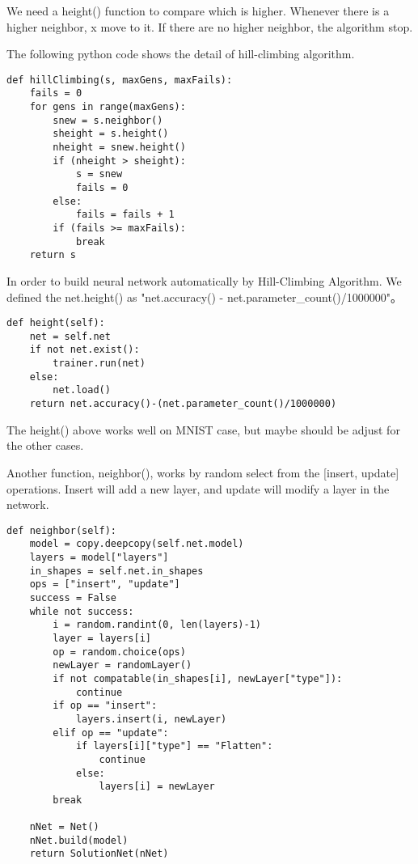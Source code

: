 \documentclass{article}
\begin{document}
We need a height() function to compare which is higher. Whenever there is a higher neighbor, x move to it. If there are no higher neighbor, the algorithm stop.

The following python code shows the detail of hill-climbing algorithm. 

\begin{minipage}{\linewidth}
\begin{lstlisting}
def hillClimbing(s, maxGens, maxFails):
    fails = 0
    for gens in range(maxGens):
        snew = s.neighbor()
        sheight = s.height()
        nheight = snew.height()
        if (nheight > sheight):
            s = snew
            fails = 0
        else:
            fails = fails + 1
        if (fails >= maxFails):
            break
    return s
\end{lstlisting}
\end{minipage}

In order to build neural network automatically by Hill-Climbing Algorithm. We defined the net.height() as "net.accuracy() - net.parameter_count()/1000000"。

\begin{minipage}{\linewidth}
\begin{lstlisting}
def height(self):
    net = self.net
    if not net.exist():
        trainer.run(net)
    else:
        net.load()
    return net.accuracy()-(net.parameter_count()/1000000)
\end{lstlisting}
\end{minipage}

The height() above works well on MNIST case, but maybe should be adjust for the other cases. 

Another function, neighbor(), works by random select from the [insert, update] operations. Insert will add a new layer, and update will modify a layer in the network.

\begin{minipage}{\linewidth}
\begin{lstlisting}
def neighbor(self):
    model = copy.deepcopy(self.net.model)
    layers = model["layers"]
    in_shapes = self.net.in_shapes
    ops = ["insert", "update"]
    success = False
    while not success:
        i = random.randint(0, len(layers)-1)
        layer = layers[i]
        op = random.choice(ops)
        newLayer = randomLayer()
        if not compatable(in_shapes[i], newLayer["type"]):
            continue
        if op == "insert":
            layers.insert(i, newLayer)
        elif op == "update":
            if layers[i]["type"] == "Flatten":
                continue
            else:
                layers[i] = newLayer
        break

    nNet = Net()
    nNet.build(model)
    return SolutionNet(nNet)
\end{lstlisting}
\end{minipage}
\end{document}
